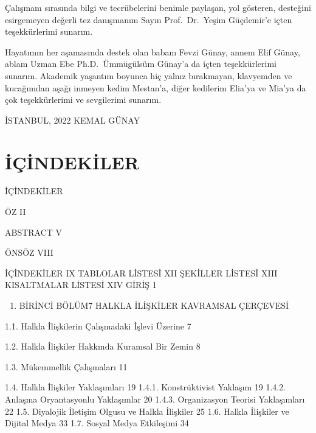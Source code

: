 \documentclass[
]{book}
\providecommand{\tightlist}{%
  \setlength{\itemsep}{0pt}\setlength{\parskip}{0pt}}
\begin{document}
Çalışmam sırasında bilgi ve tecrübelerini benimle paylaşan, yol gösteren, desteğini esirgemeyen değerli tez danışmanım Sayın Prof.~Dr.~Yeşim Güçdemir'e içten teşekkürlerimi sunarım.

Hayatımın her aşamasında destek olan babam Fevzi Günay, annem Elif Günay, ablam Uzman Ebe Ph.D.~Ümmügülsüm Günay'a da içten teşekkürlerimi sunarım. Akademik yaşantım boyunca hiç yalnız bırakmayan, klavyemden ve kucağımdan aşağı inmeyen kedim Mestan'a, diğer kedilerim Elia'ya ve Mia'ya da çok teşekkürlerimi ve sevgilerimi sunarım.

İSTANBUL, 2022
KEMAL GÜNAY

\hypertarget{iuxe7indekiler}{%
\chapter*{İÇİNDEKİLER}\label{iuxe7indekiler}}

İÇİNDEKİLER

ÖZ II

ABSTRACT V

ÖNSÖZ VIII

İÇİNDEKİLER IX
TABLOLAR LİSTESİ XII
ŞEKİLLER LİSTESİ XIII
KISALTMALAR LİSTESİ XIV
GİRİŞ 1

\begin{enumerate}
\def\labelenumi{\arabic{enumi}.}
\tightlist
\item
  BİRİNCİ BÖLÜM7
  HALKLA İLİŞKİLER KAVRAMSAL ÇERÇEVESİ
\end{enumerate}

1.1. Halkla İlişkilerin Çalışmadaki İşlevi Üzerine 7

1.2. Halkla İlişkiler Hakkında Kuramsal Bir Zemin 8

1.3. Mükemmellik Çalışmaları 11

1.4. Halkla İlişkiler Yaklaşımları 19
1.4.1. Konstrüktivist Yaklaşım 19
1.4.2. Anlaşma Oryantasyonlu Yaklaşımlar 20
1.4.3. Organizasyon Teorisi Yaklaşımları 22
1.5. Diyalojik İletişim Olgusu ve Halkla İlişkiler 25
1.6. Halkla İlişkiler ve Dijital Medya 33
1.7. Sosyal Medya Etkileşimi 34
\end{document}
